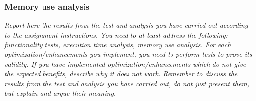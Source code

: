 \documentclass[a4paper, english]{article}
\numberwithin{equation}{section}
\begin{document}
\subsubsection{Memory use analysis}
\textit{Report here the results from the test and analysis you have carried out according to the assignment instructions.  You need to at least address the following: functionality tests, execution time analysis, memory use analysis.
    For each optimization/enhancements you implement, you need to perform tests to prove its validity. If you have implemented optimization/enhancements which do not give the expected benefits, describe why it does not work.
    Remember to discuss the results from the test and analysis you have carried out, do not just present them, but explain and argue their meaning.}

%
%




%
\end{document}

